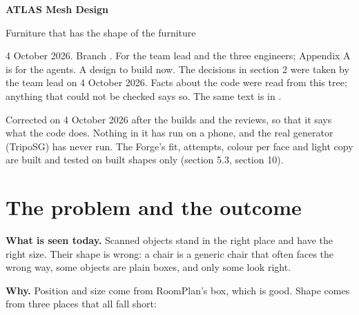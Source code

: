 \documentclass[10pt]{article}
\newcommand{\cd}{\path}
\begin{document}
\raggedright

{\fontsize{25}{29}\selectfont\bfseries ATLAS Mesh Design\par}
\vspace{1.5mm}
{\fontsize{13}{16}\selectfont\color{mute}Furniture that has the shape of the furniture\par}
\vspace{2.5mm}
{\small\color{mute}4 October 2026. Branch \cd{main}. For the team lead and the three engineers; Appendix A is for
the agents. A design to build now. The decisions in section 2 were taken by the team lead on 4 October 2026. Facts about the
code were read from this tree; anything that could not be checked says so. The same text is in \cd{ATLAS_Mesh_Design.md}.\par}
\vspace{1mm}
{\small\color{mute}Corrected on 4 October 2026 after the builds and the reviews, so that it says what the code does. Nothing in it has run on a phone, and the real generator (TripoSG) has never run. The Forge's fit, attempts, colour per face and light copy are built and tested on built shapes only (section 5.3, section 10).\par}

\section{The problem and the outcome}

\textbf{What is seen today.} Scanned objects stand in the right place and have the right size. Their shape is wrong: a chair
is a generic chair that often faces the wrong way, some objects are plain boxes, and only some look right.

\textbf{Why.} Position and size come from RoomPlan's box, which is good. Shape comes from three places that all fall short:
\end{document}
